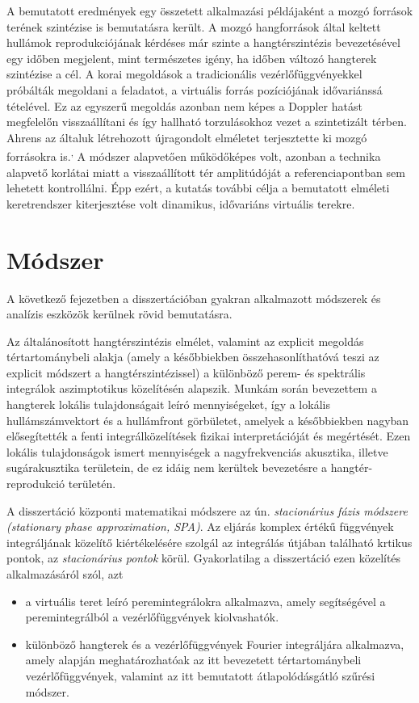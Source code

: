 \documentclass[10pt,twoside]{article}
\theoremstyle{thesisgroupstyle}
\theoremstyle{indented}
\begin{document}
A bemutatott eredmények egy összetett alkalmazási példájaként a mozgó források terének szintézise is bemutatásra került.
A mozgó hangforrások által keltett hullámok reprodukciójának kérdéses már szinte a hangtérszintézis bevezetésével egy időben megjelent, mint természetes igény, ha időben változó hangterek szintézise a cél.
A korai megoldások a tradicionális vezérlőfüggvényekkel próbálták megoldani a feladatot, a virtuális forrás pozíciójának idővariánssá tételével.
Ez az egyszerű megoldás azonban nem képes a Doppler hatást megfelelőn visszaállítani és így hallható torzulásokhoz vezet a szintetizált térben.
Ahrens az általuk létrehozott újragondolt elméletet terjesztette ki mozgó forrásokra is.\textsuperscript{,}
A módszer alapvetően működőképes volt, azonban a technika alapvető korlátai miatt a visszaállított tér amplitúdóját a referenciapontban sem lehetett kontrollálni.
Épp ezért, a kutatás további célja a bemutatott elméleti keretrendszer kiterjesztése volt dinamikus, idővariáns virtuális terekre.

\section{Módszer}

A következő fejezetben a disszertációban gyakran alkalmazott módszerek és analízis eszközök kerülnek rövid bemutatásra.

Az általánosított hangtérszintézis elmélet, valamint az explicit megoldás tértartománybeli alakja (amely a későbbiekben összehasonlíthatóvá teszi az explicit módszert a hangtérszintézissel) a különböző perem- és spektrális integrálok aszimptotikus közelítésén alapszik.
Munkám során bevezettem a hangterek lokális tulajdonságait leíró mennyiségeket, így a lokális hullámszámvektort és a hullámfront görbületet, amelyek a későbbiekben nagyban elősegítették a fenti integrálközelítések fizikai interpretációját és megértését.
Ezen lokális tulajdonságok ismert mennyiségek a nagyfrekvenciás akusztika, illetve sugárakusztika területein, de ez idáig nem kerültek bevezetésre a hangtér-reprodukció területén.

A disszertáció központi matematikai módszere az ún. \emph{stacionárius fázis módszere (stationary phase approximation, SPA)}.
Az eljárás komplex értékű függvények integráljának közelítő kiértékelésére szolgál az integrálás útjában található krtikus pontok, az \emph{stacionárius pontok} körül.
Gyakorlatilag a disszertáció ezen közelítés alkalmazásáról szól, azt 
\begin{itemize}
\item a virtuális teret leíró peremintegrálokra alkalmazva, amely segítségével a peremintegrálból a vezérlőfüggvények kiolvashatók.
\item különböző hangterek és a vezérlőfüggvények Fourier integráljára alkalmazva, amely alapján meghatározhatóak az itt bevezetett tértartománybeli vezérlőfüggvények, valamint az itt bemutatott átlapolódásgátló szűrési módszer.
\end{itemize}
\end{document}
